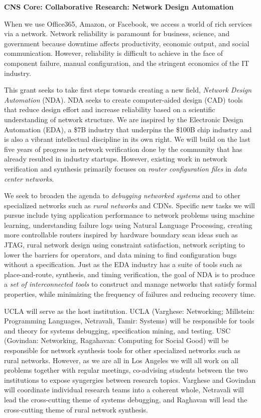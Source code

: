 \documentclass[10pt]{article}
\begin{document}
\centerline{\large\textbf{CNS Core: Collaborative Research: Network Design Automation}}
\bigskip

When we use Office365, Amazon, or Facebook, we access a world of rich services via a network. Network reliability is paramount for business, science, and government because downtime affects productivity, economic output, and social communication. However, reliability is difficult to achieve in the face of component failure, manual configuration, and the stringent economics of the IT industry.

This grant seeks to take first steps towards creating a new field, \emph{Network Design Automation} (NDA). NDA seeks to create computer-aided design (CAD) tools that reduce design effort and increase reliability based on a scientific understanding of network structure. We are inspired by the Electronic Design Automation (EDA), a \$7B industry that underpins the \$100B chip industry and is also a vibrant intellectual discipline in its own right.  We will build on 
the last five years of progress in network verification done by the community that has already resulted in industry startups. However, existing work in network verification and synthesis primarily focuses on \emph{router configuration files} in \emph{data center networks}.  

We seek to broaden the agenda to \emph{debugging networked systems} and to  other specialized networks such as \emph{rural networks} and CDNs.  Specific new tasks we will pursue include tying application performance to network problems using machine learning, understanding failure logs using Natural Language Processing, creating more controllable routers inspired by hardware boundary scan ideas such as JTAG, rural network design using constraint satisfaction, network scripting to lower the barriers for operators, and data mining to find configuration bugs without a specification. Just as the EDA industry has a suite of tools such as place-and-route, synthesis, and timing verification, the goal of NDA is to produce a \emph{set of interconnected tools} to construct and manage networks that satisfy formal properties, while minimizing the frequency of failures and reducing recovery time.

UCLA will serve as the host institution. UCLA (Varghese: Networking; Millstein: Programming Languages, Netravali, Tamir: Systems) will be responsible for tools and theory for systems debugging, specification mining, and testing. USC  (Govindan: Networking, Ragahavan: Computing for Social Good) will be responsible for network synthesis tools for other specialized networks such as rural networks.  However, as we are all in Los Angeles we will all work on all problems together with regular meetings, co-advising students between the two institutions to expose syngergies between research topics. Varghese and Govindan will coordinate individual research teams into a coherent whole, Netravali will lead the cross-cutting theme of systems debugging, and Raghavan will lead the cross-cutting theme of rural network synthesis.
\end{document}
